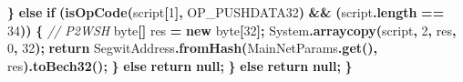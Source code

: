 \documentclass[
  italian,
  openany]{book}
\newenvironment{Shaded}{\begin{snugshade}}{\end{snugshade}}
\newcommand{\BuiltInTok}[1]{#1}
\newcommand{\CommentTok}[1]{\textcolor[rgb]{0.56,0.35,0.01}{\textit{#1}}}
\newcommand{\ControlFlowTok}[1]{\textcolor[rgb]{0.13,0.29,0.53}{\textbf{#1}}}
\newcommand{\DataTypeTok}[1]{\textcolor[rgb]{0.13,0.29,0.53}{#1}}
\newcommand{\DecValTok}[1]{\textcolor[rgb]{0.00,0.00,0.81}{#1}}
\newcommand{\FunctionTok}[1]{\textcolor[rgb]{0.13,0.29,0.53}{\textbf{#1}}}
\newcommand{\KeywordTok}[1]{\textcolor[rgb]{0.13,0.29,0.53}{\textbf{#1}}}
\newcommand{\NormalTok}[1]{#1}
\newcommand{\OperatorTok}[1]{\textcolor[rgb]{0.81,0.36,0.00}{\textbf{#1}}}
\begin{document}
\begin{Shaded}
\begin{Highlighting}[]
        \OperatorTok{\}} \ControlFlowTok{else} \ControlFlowTok{if} \OperatorTok{(}\FunctionTok{isOpCode}\OperatorTok{(}\NormalTok{script}\OperatorTok{[}\DecValTok{1}\OperatorTok{],}\NormalTok{ OP\_PUSHDATA32}\OperatorTok{)} \OperatorTok{\&\&} \OperatorTok{(}\NormalTok{script}\OperatorTok{.}\FunctionTok{length} \OperatorTok{==} \DecValTok{34}\OperatorTok{))} \OperatorTok{\{}
            \CommentTok{// P2WSH}
            \DataTypeTok{byte}\OperatorTok{[]}\NormalTok{ res }\OperatorTok{=} \KeywordTok{new} \DataTypeTok{byte}\OperatorTok{[}\DecValTok{32}\OperatorTok{];}
            \BuiltInTok{System}\OperatorTok{.}\FunctionTok{arraycopy}\OperatorTok{(}\NormalTok{script}\OperatorTok{,} \DecValTok{2}\OperatorTok{,}\NormalTok{ res}\OperatorTok{,} \DecValTok{0}\OperatorTok{,} \DecValTok{32}\OperatorTok{);}
            \ControlFlowTok{return}\NormalTok{ SegwitAddress}\OperatorTok{.}\FunctionTok{fromHash}\OperatorTok{(}\NormalTok{MainNetParams}\OperatorTok{.}\FunctionTok{get}\OperatorTok{(),}\NormalTok{ res}\OperatorTok{).}\FunctionTok{toBech32}\OperatorTok{();}
        \OperatorTok{\}} \ControlFlowTok{else} \ControlFlowTok{return} \KeywordTok{null}\OperatorTok{;}
    \OperatorTok{\}} \ControlFlowTok{else} \ControlFlowTok{return} \KeywordTok{null}\OperatorTok{;}
\OperatorTok{\}}
\end{Highlighting}
\end{Shaded}
\end{document}
